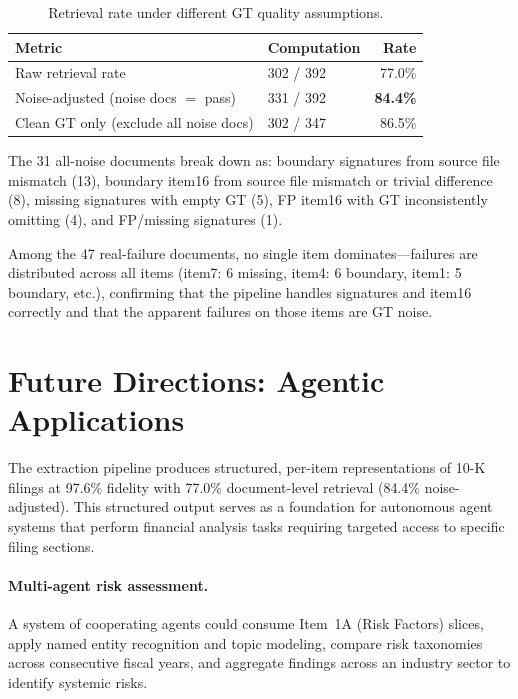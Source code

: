 \documentclass[11pt,a4paper]{article}
\begin{document}
\begin{table}[H]
\centering
\caption{Retrieval rate under different GT quality assumptions.}
\begin{tabular}{llr}
\toprule
\textbf{Metric} & \textbf{Computation} & \textbf{Rate}\\
\midrule
Raw retrieval rate & 302 / 392 & 77.0\%\\
Noise-adjusted (noise docs $=$ pass) & 331 / 392 & \textbf{84.4\%}\\
Clean GT only (exclude all noise docs) & 302 / 347 & 86.5\%\\
\bottomrule
\end{tabular}
\end{table}

\noindent
The 31 all-noise documents break down as: boundary signatures from source file mismatch (13), boundary item16 from source file mismatch or trivial difference (8), missing signatures with empty GT (5), FP item16 with GT inconsistently omitting (4), and FP/missing signatures (1).

Among the 47 real-failure documents, no single item dominates---failures are distributed across all items (item7: 6 missing, item4: 6 boundary, item1: 5 boundary, etc.), confirming that the pipeline handles signatures and item16 correctly and that the apparent failures on those items are GT noise.


\section{Future Directions: Agentic Applications}\label{sec:future}

The extraction pipeline produces structured, per-item representations of 10-K filings at 97.6\% fidelity with 77.0\% document-level retrieval (84.4\% noise-adjusted). This structured output serves as a foundation for autonomous agent systems that perform financial analysis tasks requiring targeted access to specific filing sections.

\paragraph{Multi-agent risk assessment.} A system of cooperating agents could consume Item~1A (Risk Factors) slices, apply named entity recognition and topic modeling, compare risk taxonomies across consecutive fiscal years, and aggregate findings across an industry sector to identify systemic risks.
\end{document}
